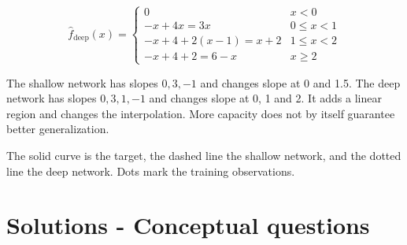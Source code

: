 \documentclass{course_sheet}
\begin{document}
\begin{equation*}
\hat f_{\mathrm{deep}}(x)=\begin{cases}
0 & x<0\\
-x+4x=3x & 0\leq x<1\\
-x+4+2(x-1)=x+2 & 1\leq x<2\\
-x+4+2=6-x & x\geq2
\end{cases}
\end{equation*}

The shallow network has slopes $0,3,-1$ and changes slope at 0 and 1.5.
The deep network has slopes $0,3,1,-1$ and changes slope at 0, 1 and 2.
It adds a linear region and changes the interpolation. More capacity
does not by itself guarantee better generalization.

The solid curve is the target, the dashed line the shallow network, and
the dotted line the deep network. Dots mark the training observations.

\begin{center}


\end{center}

\section{Solutions - Conceptual questions}
\end{document}
